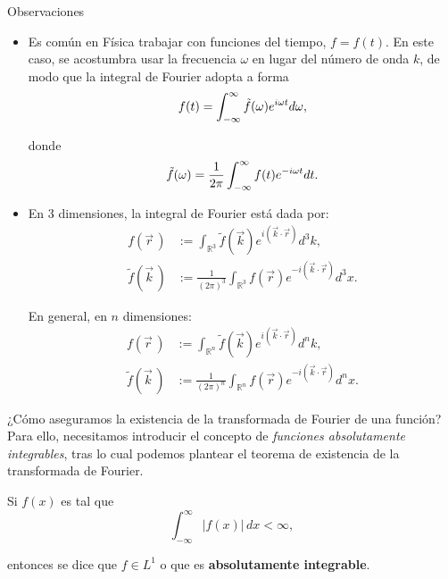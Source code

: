 \begin{obs}{Observaciones}
\begin{itemize}
        
        \item Es común en Física trabajar con funciones del tiempo, $f = f(t)$. En este caso, se acostumbra usar la frecuencia $\omega$ en lugar del número de onda $k$, de modo que la integral de Fourier adopta a forma
        $$
        f(t) = \int_{- \infty}^{\infty} \Tilde{f}(\omega) e^{i \omega t} d\omega,
        $$
    
        donde
        $$
        \Tilde{f}(\omega) = \frac{1}{2\pi} \int_{- \infty}^{\infty} f(t) e^{- i \omega t} dt.
        $$
        
        \item En 3 dimensiones, la integral de Fourier está dada por:
        \begin{align*}
             f(\vec{r}\,) &:= \int_{\mathbb{R}^3} \tilde{f}(\vec{k}) e^{i (\vec{k} \cdot \vec{r})} d^3k, \\
             \tilde{f}(\vec{k}\,) &:= \frac{1}{(2\pi)^3} \int_{\mathbb{R}^3} f(\vec{r}) e^{-i (\vec{k} \cdot \vec{r})} d^3x.
        \end{align*}
        
        En general, en $n$ dimensiones:
         \begin{align*}
             f(\vec{r}\,) &:= \int_{\mathbb{R}^n} \tilde{f}(\vec{k}) e^{i (\vec{k} \cdot \vec{r})} d^n k, \\
             \tilde{f}(\vec{k}\,) &:= \frac{1}{(2\pi)^n} \int_{\mathbb{R}^n} f(\vec{r}) e^{-i (\vec{k} \cdot \vec{r})} d^n x.
        \end{align*}
       
    \end{itemize}    
\end{obs}



¿Cómo aseguramos la existencia de la transformada de Fourier de una función? Para ello, necesitamos introducir el concepto de \emph{funciones absolutamente integrables}, tras lo cual podemos plantear el teorema de existencia de la transformada de Fourier.

\begin{defi} 
Si $f(x)$ es tal que 
$$\int_{-\infty}^{\infty} |f(x)| \,dx < \infty,$$

entonces se dice que $f \in  L^1$ o que es \textbf{absolutamente integrable}.
\end{defi}

